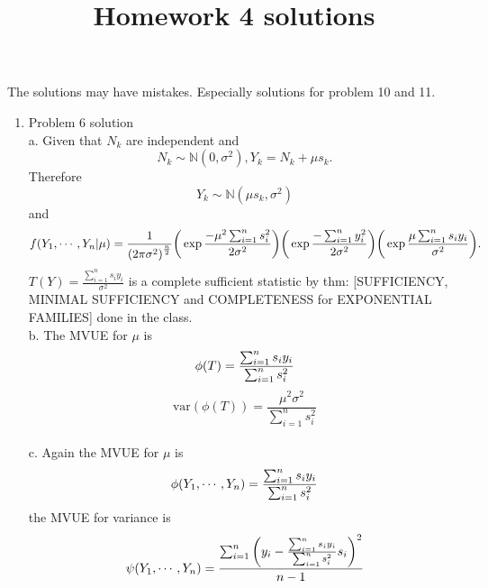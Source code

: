 \documentclass[a4paper,english,10pt]{article}
\title{Homework 4 solutions}
\begin{document}
\maketitle

The solutions may have mistakes. Especially solutions for problem 10 and 11.

\begin{enumerate}
\item {Problem 6 solution}\\
a. Given that $N_k$ are independent and
 \begin{equation*}
        N_k \sim \mathbb{N}(0,\sigma^2), Y_k=N_k+\mu s_k.
 \end{equation*}
Therefore 
\begin{equation*}
  Y_k \sim \mathbb{N}(\mu s_k, \sigma^2)
\end{equation*}
and 
\begin{equation*}
 f(Y_1,\cdots, Y_n|\mu)=\frac{1}{{(2\pi\sigma^2)}^{\frac{n}{2}}} \bigg{(} \exp{\frac{-\mu^2\sum_{i=1}^{n} s_{i}^2}{2\sigma^2}}\bigg{)}
\bigg{(}\exp{\frac{-\sum_{i=1}^{n} y_{i}^2}{2\sigma^2}}\bigg{)}\bigg{(}\exp{\frac{\mu\sum_{i=1}^{n} s_{i}y_{i}}{\sigma^2}}\bigg{)}.
\end{equation*}
$T(Y)=\frac{\sum_{i=1}^{n} s_{i}y_{i}}{\sigma^2}$ is a complete sufficient statistic by
thm: [SUFFICIENCY, MINIMAL SUFFICIENCY and COMPLETENESS for EXPONENTIAL FAMILIES] done in the class.
\\

b. The MVUE for $\mu$ is
\begin{equation*}
 \phi(T)=\frac{\sum_{i=1}^{n} s_{i}y_{i}}{\sum_{i=1}^{n} s_{i}^2} \\ 
 \end{equation*}
\begin{equation*}
 \text{var}(\phi(T))=\frac{\mu^2\sigma^2}{\sum_{i=1}^{n}s_{i}^2}
\end{equation*}
\\

c. Again the MVUE for $\mu$ is
\begin{equation*}
 \phi(Y_1,\cdots,Y_n)=\frac{\sum_{i=1}^{n} s_{i}y_{i}}{\sum_{i=1}^{n} s_{i}^2} \\ 
 \end{equation*}
 the MVUE for variance is
 \begin{equation*}
 \psi(Y_1,\cdots,Y_n)=\frac{\sum_{i=1}^{n}{\bigg{(}y_i-\frac{\sum_{i=1}^{n}s_{i}y_{i}}{\sum_{i=1}^{n}s_{i}^2} s_i\bigg{)}^2}}{n-1} \\ 
 \end{equation*}


\end{enumerate}
\end{document}
